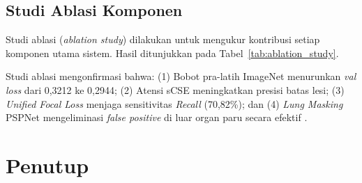 \documentclass[12pt,a4paper,twocolumn]{article}
\newcommand{\parencite}[1]{\citep{#1}}
\begin{document}
\subsection{Studi Ablasi Komponen}

Studi ablasi (\textit{ablation study}) dilakukan untuk mengukur kontribusi
setiap komponen utama sistem. Hasil ditunjukkan pada
Tabel~\ref{tab:ablation_study}.

\begin{table}[H]
  \centering
  \caption{Studi Ablasi: Dampak Komponen terhadap Performa.}
  \label{tab:ablation_study}
\end{table}

Studi ablasi mengonfirmasi bahwa: (1) Bobot pra-latih ImageNet menurunkan
\textit{val loss} dari 0,3212 ke 0,2944; (2) Atensi sCSE meningkatkan presisi
batas lesi; (3) \textit{Unified Focal Loss} menjaga sensitivitas \textit{Recall}
(70,82\%); dan (4) \textit{Lung Masking} PSPNet mengeliminasi \textit{false
positive} di luar organ paru secara efektif \parencite{bassi2022}.

\section{Penutup}
\end{document}
